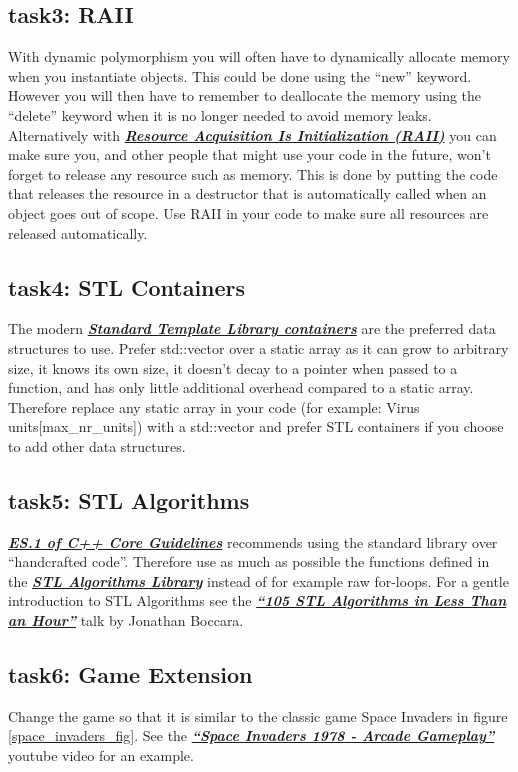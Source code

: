 \documentclass[12pt]{article}
\newcommand*{\link}[2]{\href{#1}{\color{blue}\textbf{\textit{#2}}}}
\begin{document}
\subsection{task3: RAII}
With dynamic polymorphism you will often have to dynamically allocate
memory when you instantiate objects. This could be done using the
``new'' keyword. However you will then have to remember to deallocate
the memory using the ``delete'' keyword when it is no longer needed to
avoid memory leaks. Alternatively with
\link{https://en.cppreference.com/w/cpp/language/raii}{Resource
  Acquisition Is Initialization (RAII)} you can make sure you, and
other people that might use your code in the future, won't forget to
release any resource such as memory. This is done by putting the code
that releases the resource in a destructor that is automatically
called when an object goes out of scope. Use RAII in your code to make
sure all resources are released automatically.

\subsection{task4: STL Containers}
The modern \link{http://www.cplusplus.com/reference/stl/}{Standard
  Template Library containers} are the preferred data structures to
use. Prefer std::vector over a static array as it can grow to
arbitrary size, it knows its own size, it doesn't decay to a pointer when
passed to a function, and has only little additional overhead compared
to a static array. Therefore replace any static array in your code
(for example: Virus units[max\_nr\_units]) with a std::vector and
prefer STL containers if you choose to add other data structures.

\subsection{task5: STL Algorithms}
\link{https://isocpp.github.io/CppCoreGuidelines/CppCoreGuidelines\#Res-lib}
{ES.1 of C++ Core Guidelines} recommends using the standard library
over ``handcrafted code''.  Therefore use as much as possible the
functions defined in the
\link{https://en.cppreference.com/w/cpp/algorithm} {STL Algorithms
  Library} instead of for example raw for-loops. For a gentle
introduction to STL Algorithms see the
\link{https://www.youtube.com/watch?v=2olsGf6JIkU} {``105 STL
  Algorithms in Less Than an Hour''} talk by Jonathan Boccara.

\subsection{task6: Game Extension}
Change the game so that it is similar to the classic game Space Invaders in figure \ref{space_invaders_fig}. See the \link{https://www.youtube.com/watch?v=MU4psw3ccUI} {``Space Invaders 1978 - Arcade Gameplay''} youtube video for an example.
\end{document}
